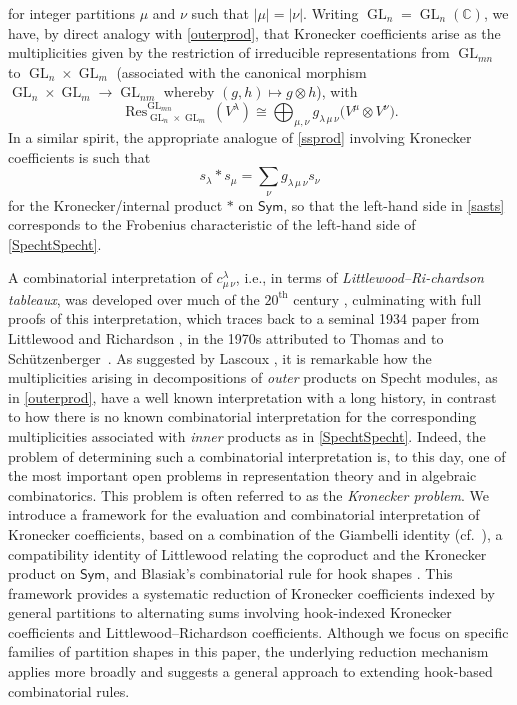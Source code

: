\documentclass[12pt]{article}
\begin{document}
 for integer partitions $\mu$ and $\nu$ such that $|\mu| = |\nu|$. Writing $\operatorname{GL}_n = \operatorname{GL}_n(\mathbb{C})$, 
 we have, by direct analogy with \eqref{outerprod}, that Kronecker 
 coefficients arise as the multiplicities given by the restriction of irreducible representations from $\operatorname{GL}_{mn}$ to
 $\operatorname{GL}_{n} \times \operatorname{GL}_{m}$ (associated with the canonical morphism
 $\operatorname{GL}_{n} \times \operatorname{GL}_{m} \to \operatorname{GL}_{n m}$ whereby $(g, h) \mapsto g \otimes h$), 
 with $$ \operatorname{Res}^{\operatorname{GL}_{mn} }_{ \operatorname{GL}_n
 \times \operatorname{GL}_m }(V^{\lambda})
 \cong \bigoplus_{\mu, \nu} g_{\lambda \, \mu \, \nu} \big( V^{\mu} \otimes V^{\nu} \big). $$
 In a similar spirit, the appropriate analogue of \eqref{ssprod} involving Kronecker coefficients is such that 
\begin{equation}\label{sasts}
 s_{\lambda} \ast s_{\mu} = \sum_{\nu} g_{\lambda \, \mu \, \nu} s_{\nu} 
\end{equation}
 for the Kronecker/internal product $\ast$ on $\textsf{Sym}$, so that the left-hand side in \eqref{sasts} corresponds to the 
 Frobenius characteristic of the left-hand side of \eqref{SpechtSpecht}. 

 A combinatorial interpretation of $c_{\mu \, \nu}^{\lambda}$, i.e., in terms of \emph{Littlewood--Ri-chardson tableaux}, was developed 
 over much of the $20^{\text{th}}$ century \cite[pp.\ 176--177]{Sagan2001}, culminating with full proofs of this interpretation, 
 which traces back to a seminal 1934 paper from Littlewood and Richardson \cite{LittlewoodRichardson1934}, in the 
 1970s attributed to Thomas \cite{Thomas1974,Thomas1978} and to Sch\"utzenberger~\cite{Schutzenberger1977}. As suggested by 
 Lascoux \cite{Lascoux1980}, it is remarkable how the multiplicities arising in decompositions of \emph{outer} products on Specht
 modules, as in \eqref{outerprod}, have a well known interpretation with a long history, in contrast to how there is no known 
 combinatorial interpretation for the corresponding multiplicities associated with \emph{inner} products as in \eqref{SpechtSpecht}. 
 Indeed, the problem of determining such a combinatorial interpretation is, to this day, one of the most important open problems in 
 representation theory and in algebraic combinatorics. This problem is often referred to as the \emph{Kronecker problem}. 
 We introduce a framework for the evaluation and combinatorial interpretation of Kronecker coefficients, based on a combination of the 
 Giambelli identity \cite{Giambelli1903} (cf.\ \cite[pp.\ 47, 61]{Macdonald1995}), a compatibility identity of Littlewood 
 \cite{Littlewood1956} relating the coproduct and the Kronecker product on $\textsf{Sym}$, and Blasiak's combinatorial rule for
 hook shapes \cite{Blasiak20162018}. This framework provides a systematic reduction of Kronecker coefficients indexed by 
 general partitions to alternating sums involving hook-indexed Kronecker coefficients and Littlewood--Richardson coefficients. 
 Although we focus on specific families of partition shapes in this paper, the underlying reduction mechanism applies more broadly
 and suggests a general approach to extending hook-based combinatorial rules.
\end{document}
